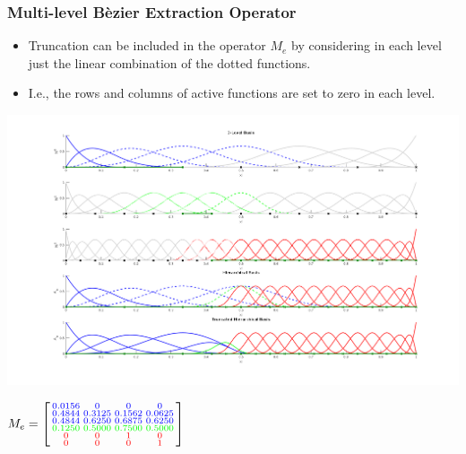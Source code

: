 \documentclass{beamer}
\begin{document}
\begin{frame}
	\frametitle{Multi-level B\`ezier Extraction Operator}
	\begin{itemize}
		\item Truncation can be included in the operator $ M_e $ by considering in each level just the linear combination of the dotted functions.
		\item I.e., the rows and columns of active functions are set to zero in each level.
	\end{itemize}
	
		\centering
		\begin{minipage}{0.78\textwidth}
			\centering
			\includegraphics[scale=0.205]{operators1d/THBS.png}
		\end{minipage}
		\begin{minipage}{0.21\textwidth}
			\tiny%
	\centering	
$ M_e= \left[\begin{smallmatrix}
\textcolor{blue}{0.0156}  &       \textcolor{blue}{0}   &      \textcolor{blue}{0}   &      \textcolor{blue}{0}\\
\textcolor{blue}{0.4844}  &  \textcolor{blue}{0.3125}  &  \textcolor{blue}{0.1562}   & \textcolor{blue}{0.0625}\\
\textcolor{blue}{0.4844} &   \textcolor{blue}{0.6250}   & \textcolor{blue}{0.6875}  &\textcolor{blue}{0.6250}\\
\textcolor{green}{0.1250} &   \textcolor{green}{ 0.5000} &   \textcolor{green}{0.7500}  &   \textcolor{green}{0.5000}\\
\textcolor{red}{0}       &  \textcolor{red}{0}   & \textcolor{red}{1}      &   \textcolor{red}{0}\\
\textcolor{red}{0}       &  \textcolor{red}{0}   &      \textcolor{red}{0}  &  \textcolor{red}{1}\\
\end{smallmatrix} \right]
$
			\hspace{1cm}\\
			\vspace{0.3cm}
	\hspace{1cm}\\
			

\end{minipage}
\end{frame}
\end{document}
